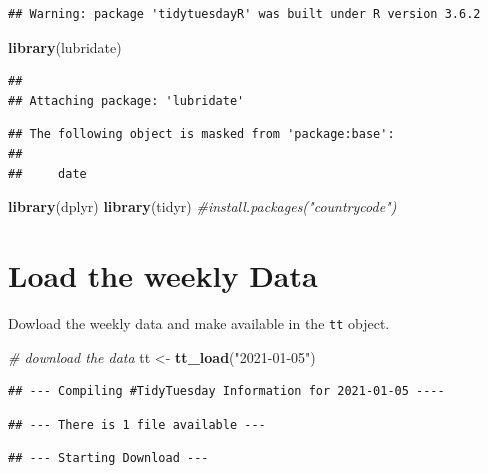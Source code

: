 \documentclass[]{article}
\newenvironment{Shaded}{\begin{snugshade}}{\end{snugshade}}
\newcommand{\CommentTok}[1]{\textcolor[rgb]{0.56,0.35,0.01}{\textit{#1}}}
\newcommand{\KeywordTok}[1]{\textcolor[rgb]{0.13,0.29,0.53}{\textbf{#1}}}
\newcommand{\NormalTok}[1]{#1}
\newcommand{\StringTok}[1]{\textcolor[rgb]{0.31,0.60,0.02}{#1}}
\begin{document}
\begin{verbatim}
## Warning: package 'tidytuesdayR' was built under R version 3.6.2
\end{verbatim}

\begin{Shaded}
\begin{Highlighting}[]
\KeywordTok{library}\NormalTok{(lubridate)}
\end{Highlighting}
\end{Shaded}

\begin{verbatim}
## 
## Attaching package: 'lubridate'
\end{verbatim}

\begin{verbatim}
## The following object is masked from 'package:base':
## 
##     date
\end{verbatim}

\begin{Shaded}
\begin{Highlighting}[]
\KeywordTok{library}\NormalTok{(dplyr)}
\KeywordTok{library}\NormalTok{(tidyr)}
\CommentTok{#install.packages("countrycode")}
\end{Highlighting}
\end{Shaded}

\hypertarget{load-the-weekly-data}{%
\section{Load the weekly Data}\label{load-the-weekly-data}}

Dowload the weekly data and make available in the \texttt{tt} object.

\begin{Shaded}
\begin{Highlighting}[]
\CommentTok{# download the data}
\NormalTok{tt <-}\StringTok{ }\KeywordTok{tt_load}\NormalTok{(}\StringTok{"2021-01-05"}\NormalTok{)}
\end{Highlighting}
\end{Shaded}

\begin{verbatim}
## --- Compiling #TidyTuesday Information for 2021-01-05 ----
\end{verbatim}

\begin{verbatim}
## --- There is 1 file available ---
\end{verbatim}

\begin{verbatim}
## --- Starting Download ---
\end{verbatim}
\end{document}

